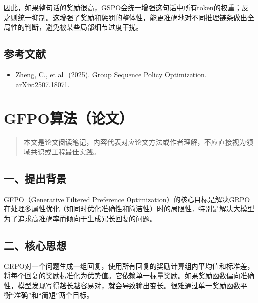 因此，如果整句话的奖励很高，GSPO会统一增强这句话中所有token的权重；反之则统一抑制。这增强了奖励和惩罚的整体性，能更准确地对不同推理链条做出全局性的判断，避免被某些局部细节过度干扰。

\hypertarget{ux53c2ux8003ux6587ux732e-109}{%
\subsection{参考文献}\label{ux53c2ux8003ux6587ux732e-109}}

\begin{itemize}
\tightlist
\item
  Zheng, C., et al.~(2025). \href{https://arxiv.org/abs/2507.18071}{Group Sequence Policy Optimization}. arXiv:2507.18071.
\end{itemize}

\clearpage

\hypertarget{gfpoux7b97ux6cd5ux8bbaux6587}{%
\section{GFPO算法（论文）}\label{gfpoux7b97ux6cd5ux8bbaux6587}}

\begin{quote}
本文是论文阅读笔记，内容代表对应论文方法或作者理解，不应直接视为领域共识或工程最佳实践。
\end{quote}

\hypertarget{ux4e00ux63d0ux51faux80ccux666f-1}{%
\subsection{一、提出背景}\label{ux4e00ux63d0ux51faux80ccux666f-1}}

GFPO（Generative Filtered Preference Optimization）的核心目标是解决GRPO在处理多属性优化（如同时优化准确性和简洁性）时的局限性，特别是解决大模型为了追求高准确率而倾向于生成冗长回复的问题。

\hypertarget{ux4e8cux6838ux5fc3ux601dux60f3-2}{%
\subsection{二、核心思想}\label{ux4e8cux6838ux5fc3ux601dux60f3-2}}

GRPO对一个问题生成一组回复，使用所有回复的奖励计算组内平均值和标准差，将每个回复的奖励标准化为优势值。它依赖单一标量奖励。如果奖励函数偏向准确性，模型发现写得越长越容易对，就会导致输出变长。很难通过单一奖励函数平衡``准确''和``简短''两个目标。

